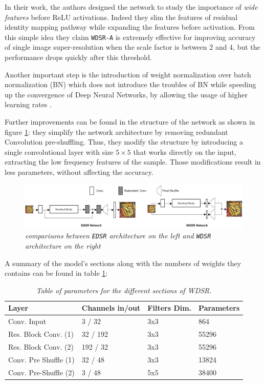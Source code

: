 \documentclass[12pt,a4paper]{report}
\begin{document}
In their work, the authors designed the network to study the importance of {\it wide features} before ReLU activations. Indeed they slim the features of residual identity mapping pathway while expanding the features before activation.
From this simple idea they claim {\tt WDSR-A} is extremely effective for improving accuracy of single image super-resolution when the scale factor is between 2 and 4, but the performance drops quickly after this threshold.

Another important step is the introduction of weight normalization over batch normalization (BN) which does not introduce the troubles of BN while speeding up the convergence of Deep Neural Networks, by allowing the usage of higher learning rates \cite{wdsr}.

Further improvements can be found in the structure of the network as shown in figure \ref{fig:edsr-wdsr-structure}: they simplify the network architecture by removing redundant Convolution pre-shuffling. 
Thus, they modify the structure by introducing a single convolutional layer with size $5  \times 5$ that works directly on the input, extracting the low frequency features of the sample. 
Those modifications result in less parameters, without affecting the accuracy.

\begin{figure}[H]
 \centering
 \includegraphics[scale=0.9]{./images/edsr_wdsr_structure.png}
 \caption{\it comparisons between {\tt EDSR} architecture on the left and {\tt WDSR} architecture on the right}
 \label{fig:edsr-wdsr-structure}
\end{figure}

A summary of the model's sections along with the numbers of weights they contains can be found in table \ref{tab:wdsr-weights}: 

\begin{table}[H]
\begin{center}
\setlength{\tabcolsep}{14pt}
\begin{tabular}{|l l l l|}
 \hline
 Layer & Channels in/out & Filters Dim. & Parameters \\
 \hline
 Conv. Input           & 3 / 32   & 3x3 & 864  \\[0.3cm]
 Res. Block Conv. (1)  & 32 / 192 & 3x3 & 55296\\[0.3cm]
 Res. Block Conv. (2)  & 192 / 32 & 3x3 & 55296\\[0.3CM]
 Conv. Pre Shuffle (1) & 32 / 48  & 3x3 & 13824\\[0.3cm]
 Conv. Pre-Shuffle (2) & 3 / 48   & 5x5 & 38400\\
 \hline
\end{tabular}
\end{center}
\label{tab:wdsr-weights}
\caption{\it Table of parameters for the different sections of WDSR.}
\end{table}
\end{document}
